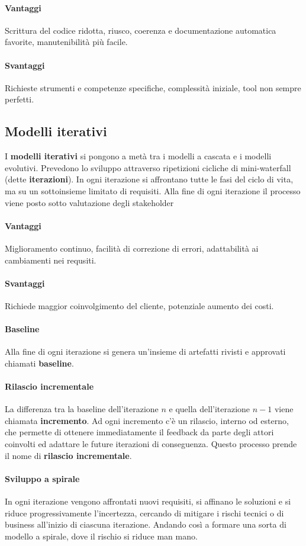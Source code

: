 \paragraph{Vantaggi} Scrittura del codice ridotta, riusco, coerenza e documentazione automatica favorite, manutenibilità più facile.
\paragraph{Svantaggi} Richieste strumenti e competenze specifiche, complessità iniziale, tool non sempre perfetti. 
\subsection{Modelli iterativi}
\label{process-model:iterativi}
I \textbf{modelli iterativi} si pongono a metà tra i modelli a cascata e i modelli evolutivi. Prevedono lo sviluppo attraverso ripetizioni cicliche di mini-waterfall (dette \textbf{iterazioni}). In ogni iterazione si affrontano tutte le fasi del ciclo di vita, ma su un sottoinsieme limitato di requisiti. Alla fine di ogni iterazione il processo viene posto sotto valutazione degli {stakeholder} \\
\paragraph{Vantaggi} Miglioramento continuo, facilità di correzione di errori, adattabilità ai cambiamenti nei requsiti.
\paragraph{Svantaggi} Richiede maggior coinvolgimento del cliente, potenziale aumento dei costi. 
\paragraph{Baseline}
\label{concept:baseline}
Alla fine di ogni iterazione si genera un'insieme di {artefatti} rivisti e approvati chiamati \textbf{baseline}.
\paragraph{Rilascio incrementale}
\label{concept:rilascio-incrementale}
La differenza tra la {baseline} dell'iterazione $n$ e quella dell'iterazione $n-1$ viene chiamata \textbf{incremento}. Ad ogni incremento c'è un rilascio, interno od esterno, che permette di ottenere immediatamente il feedback da parte degli attori coinvolti ed adattare le future iterazioni di conseguenza. Questo processo prende il nome di \textbf{rilascio incrementale}.
\paragraph{Sviluppo a spirale}
\label{concept:sviluppo-spirale}
In ogni iterazione vengono affrontati nuovi requisiti, si affinano le soluzioni e si riduce progressivamente l'incertezza, cercando di mitigare i rischi tecnici o di business all'inizio di ciascuna iterazione. Andando così a formare una sorta di modello a spirale, dove il {rischio} si riduce man mano.